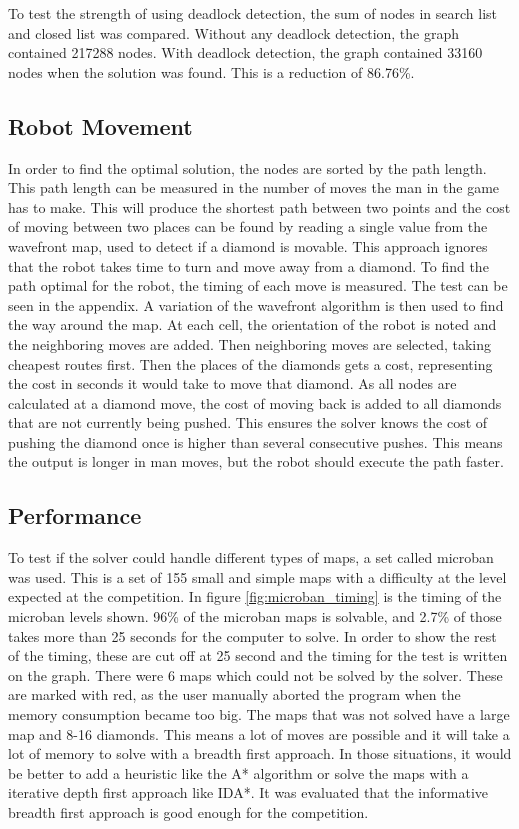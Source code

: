 To test the strength of using deadlock detection, the sum of nodes in search list and closed list was compared.
Without any deadlock detection, the graph contained 217288 nodes.
With deadlock detection, the graph contained 33160 nodes when the solution was found.
This is a reduction of 86.76\%. 

\subsection{Robot Movement}
In order to find the optimal solution, the nodes are sorted by the path length.
This path length can be measured in the number of moves the man in the game has to make.
This will produce the shortest path between two points and the cost of moving between two places can be found by reading a single value from the wavefront map, used to detect if a diamond is movable.
This approach ignores that the robot takes time to turn and move away from a diamond.
To find the path optimal for the robot, the timing of each move is measured.
The test can be seen in the appendix.
A variation of the wavefront algorithm is then used to find the way around the map.
At each cell, the orientation of the robot is noted and the neighboring moves are added.
Then neighboring moves are selected, taking cheapest routes first.
Then the places of the diamonds gets a cost, representing the cost in seconds it would take to move that diamond.
As all nodes are calculated at a diamond move, the cost of moving back is added to all diamonds that are not currently being pushed.
This ensures the solver knows the cost of pushing the diamond once is higher than several consecutive pushes. 
This means the output is longer in man moves, but the robot should execute the path faster.

\subsection{Performance}
To test if the solver could handle different types of maps, a set called microban \cite{url:microban} was used.
This is a set of 155 small and simple maps with a difficulty at the level expected at the competition.
In figure \ref{fig:microban_timing} is the timing of the microban levels shown.
96\% of the microban maps is solvable, and 2.7\% of those takes more than 25 seconds for the computer to solve.
In order to show the rest of the timing, these are cut off at 25 second and the timing for the test is written on the graph.
There were 6 maps which could not be solved by the solver. These are marked with red, as the user manually aborted the program when the memory consumption became too big.
The maps that was not solved have a large map and 8-16 diamonds. 
This means a lot of moves are possible and it will take a lot of memory to solve with a breadth first approach.
In those situations, it would be better to add a heuristic like the A* algorithm or solve the maps with a iterative depth first approach like IDA*.
It was evaluated that the informative breadth first approach is good enough for the competition.

